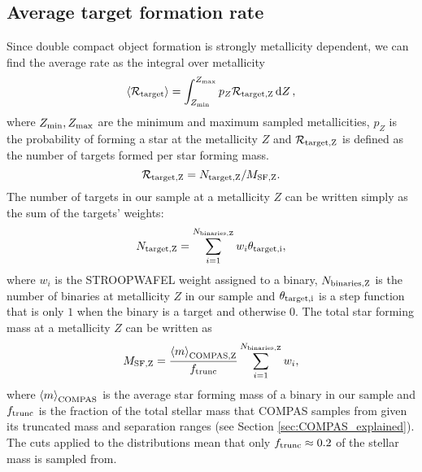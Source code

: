 \subsection{Average target formation rate}
Since double compact object formation is strongly metallicity dependent, we can find the average rate as the integral over metallicity
\begin{equation}\label{eq:norm_avg_target_formation}
    \avg{ \mathcal{R}_{\rm target} } = \int_{Z_{\rm min}}^{Z_{\rm max}} p_{Z} \mathcal{R}_{\rm target, Z} \dd{Z},
\end{equation}
where $Z_{\rm min}, Z_{\rm max}$ are the minimum and maximum sampled metallicities, $p_Z$ is the probability of forming a star at the metallicity $Z$ \citep{Frankel+2018} and $\mathcal{R}_{\rm target, Z}$ is defined as the number of targets formed per star forming mass. 
\begin{equation}
    \mathcal{R}_{\rm target, Z} =  N_{\rm target, Z} / M_{\rm SF, Z}.
\end{equation}
The number of targets in our sample at a metallicity $Z$ can be written simply as the sum of the targets' weights:
\begin{equation}
    N_{\rm target, Z} = \sum_{i=1}^{N_{\rm binaries, Z}} w_i \theta_{\rm target, i},
\end{equation}
where $w_i$ is the STROOPWAFEL weight assigned to a binary, $N_{\rm binaries, Z}$ is the number of binaries at metallicity $Z$ in our sample and $\theta_{\rm target, i}$ is a step function that is only $1$ when the binary is a target and otherwise 0. The total star forming mass at a metallicity $Z$ can be written as
\begin{equation}
    M_{\rm SF, Z} = \frac{\avg{m}_{\rm COMPAS, Z}}{f_{\rm trunc}} \sum_{i=1}^{N_{\rm binaries, Z}} w_i,
\end{equation}
where $\left\langle m\right\rangle_{\rm COMPAS}$ is the average star forming mass of a binary in our sample and $f_{\rm trunc}$ is the fraction of the total stellar mass that COMPAS samples from given its truncated mass and separation ranges (see Section \ref{sec:COMPAS_explained}). The cuts applied to the distributions mean that only $f_{\rm trunc} \approx 0.2$ of the stellar mass is sampled from.


